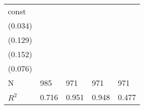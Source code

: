 \begin{tabular}{lllll}
const                     &   \makecell{$0.129^{***}$ \\ (0.034)} &     \makecell{$0.009^{}$ \\ (0.129)} &     \makecell{$0.028^{}$ \\ (0.152)} &    \makecell{$0.240^{***}$ \\ (0.076)} \\
\midrule N                &                                   985 &                                  971 &                                  971 &                                    971 \\
$R^2$                     &                                 0.716 &                                0.951 &                                0.948 &                                  0.477 \\
\bottomrule
\end{tabular}
